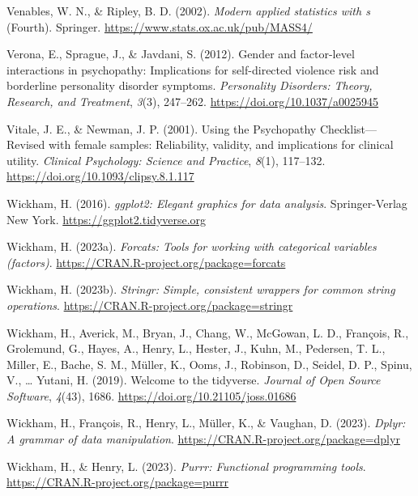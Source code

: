 \documentclass[
  man,floatsintext]{apa7}
\newlength{\cslhangindent}
\newlength{\cslentryspacingunit} %
\newenvironment{CSLReferences}[2] %
 {%
  \setlength{\parindent}{0pt}
  \ifodd #1
  \let\oldpar\par
  \def\par{\hangindent=\cslhangindent\oldpar}
  \fi
  \setlength{\parskip}{#2\cslentryspacingunit}
 }%
 {}
\begin{document}
\begin{CSLReferences}{1}{0}
\leavevmode{}%
Venables, W. N., \& Ripley, B. D. (2002). \emph{Modern applied statistics with s} (Fourth). Springer. \url{https://www.stats.ox.ac.uk/pub/MASS4/}

\leavevmode{}%
Verona, E., Sprague, J., \& Javdani, S. (2012). Gender and factor-level interactions in psychopathy: {Implications} for self-directed violence risk and borderline personality disorder symptoms. \emph{Personality Disorders: Theory, Research, and Treatment}, \emph{3}(3), 247--262. \url{https://doi.org/10.1037/a0025945}

\leavevmode{}%
Vitale, J. E., \& Newman, J. P. (2001). Using the {Psychopathy Checklist}---{Revised} with female samples: {Reliability}, validity, and implications for clinical utility. \emph{Clinical Psychology: Science and Practice}, \emph{8}(1), 117--132. \url{https://doi.org/10.1093/clipsy.8.1.117}

\leavevmode{}%
Wickham, H. (2016). \emph{ggplot2: Elegant graphics for data analysis}. Springer-Verlag New York. \url{https://ggplot2.tidyverse.org}

\leavevmode{}%
Wickham, H. (2023a). \emph{Forcats: Tools for working with categorical variables (factors)}. \url{https://CRAN.R-project.org/package=forcats}

\leavevmode{}%
Wickham, H. (2023b). \emph{Stringr: Simple, consistent wrappers for common string operations}. \url{https://CRAN.R-project.org/package=stringr}

\leavevmode{}%
Wickham, H., Averick, M., Bryan, J., Chang, W., McGowan, L. D., François, R., Grolemund, G., Hayes, A., Henry, L., Hester, J., Kuhn, M., Pedersen, T. L., Miller, E., Bache, S. M., Müller, K., Ooms, J., Robinson, D., Seidel, D. P., Spinu, V., \ldots{} Yutani, H. (2019). Welcome to the {tidyverse}. \emph{Journal of Open Source Software}, \emph{4}(43), 1686. \url{https://doi.org/10.21105/joss.01686}

\leavevmode{}%
Wickham, H., François, R., Henry, L., Müller, K., \& Vaughan, D. (2023). \emph{Dplyr: A grammar of data manipulation}. \url{https://CRAN.R-project.org/package=dplyr}

\leavevmode{}%
Wickham, H., \& Henry, L. (2023). \emph{Purrr: Functional programming tools}. \url{https://CRAN.R-project.org/package=purrr}


\end{CSLReferences}
\end{document}
